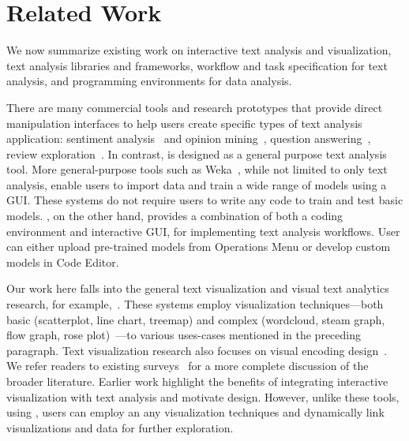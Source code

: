 \section{Related Work}\label{sec:related}

We now summarize existing work on interactive text analysis and visualization, text analysis libraries and frameworks, workflow and task specification for text analysis, and programming environments for data analysis.

There are many commercial tools and research prototypes 
that provide direct manipulation interfaces to help users
create specific types of text analysis application:
sentiment analysis~\cite{zhao2014pearl,wang2015senticompass,brooks2014collaborative} and opinion mining~\cite{miao2009amazing,wu2010opinionseer,mahmud2016predicting}, 
question answering~\cite{shen2015word,gordon2018iqa,hoque2017cqavis},
review exploration~\cite{zhang2020teddy, wang2020extremereader, suhara2020opiniondigest}.
In contrast, \system is designed 
as a general purpose text analysis tool.
More
general-purpose tools such as Weka~\cite{hall2009weka},
while not limited to
only text analysis, enable users to
import data and train a wide range of models using
a GUI. These systems do not require 
users to write any code to train and test basic
models.
\system, on the other hand,
provides a combination
of both a coding environment and interactive GUI, 
for implementing text analysis workflows. 
User can either upload pre-trained models from 
Operations Menu
or develop custom models in Code Editor. 

Our work here falls into the general text visualization and visual text analytics research, for example,~\cite{collins2009parallel, zhang2020teddy, wu2010opinionseer, zhao2014pearl, dou2013hierarchicaltopics}. 
These systems employ visualization techniques---both basic 
(\eg scatterplot, line chart, treemap) and complex (\eg wordcloud, steam graph, flow graph, rose plot)~\cite{liu2018bridging}---to various uses-cases mentioned in the preceding paragraph.
Text visualization research also focuses on visual
encoding design~\cite{collins2009parallel,felix2016texttile,chuang2012interpretation,havre2000themeriver}. 
We refer readers to existing surveys~\cite{liu2018bridging, kucher2018state} for a more complete
discussion of the broader literature. Earlier work highlight the benefits of integrating interactive visualization with text analysis
and motivate \system design. However, unlike these tools, using \system, users can employ an any visualization techniques and dynamically link visualizations and data for further exploration. 


